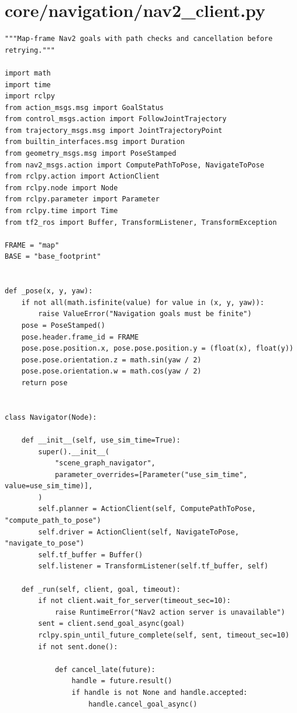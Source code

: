 \documentclass[11pt,a4paper]{book}
\begin{document}
\section{core/navigation/nav2\_client.py}
\begin{lstlisting}
"""Map-frame Nav2 goals with path checks and cancellation before retrying."""

import math
import time
import rclpy
from action_msgs.msg import GoalStatus
from control_msgs.action import FollowJointTrajectory
from trajectory_msgs.msg import JointTrajectoryPoint
from builtin_interfaces.msg import Duration
from geometry_msgs.msg import PoseStamped
from nav2_msgs.action import ComputePathToPose, NavigateToPose
from rclpy.action import ActionClient
from rclpy.node import Node
from rclpy.parameter import Parameter
from rclpy.time import Time
from tf2_ros import Buffer, TransformListener, TransformException

FRAME = "map"
BASE = "base_footprint"


def _pose(x, y, yaw):
    if not all(math.isfinite(value) for value in (x, y, yaw)):
        raise ValueError("Navigation goals must be finite")
    pose = PoseStamped()
    pose.header.frame_id = FRAME
    pose.pose.position.x, pose.pose.position.y = (float(x), float(y))
    pose.pose.orientation.z = math.sin(yaw / 2)
    pose.pose.orientation.w = math.cos(yaw / 2)
    return pose


class Navigator(Node):

    def __init__(self, use_sim_time=True):
        super().__init__(
            "scene_graph_navigator",
            parameter_overrides=[Parameter("use_sim_time", value=use_sim_time)],
        )
        self.planner = ActionClient(self, ComputePathToPose, "compute_path_to_pose")
        self.driver = ActionClient(self, NavigateToPose, "navigate_to_pose")
        self.tf_buffer = Buffer()
        self.listener = TransformListener(self.tf_buffer, self)

    def _run(self, client, goal, timeout):
        if not client.wait_for_server(timeout_sec=10):
            raise RuntimeError("Nav2 action server is unavailable")
        sent = client.send_goal_async(goal)
        rclpy.spin_until_future_complete(self, sent, timeout_sec=10)
        if not sent.done():

            def cancel_late(future):
                handle = future.result()
                if handle is not None and handle.accepted:
                    handle.cancel_goal_async()


\end{lstlisting}
\end{document}

